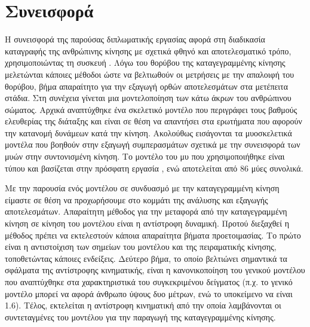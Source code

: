 \section{Συνεισφορά}

Η συνεισφορά της παρούσας διπλωματικής εργασίας αφορά στη διαδικασία καταγραφής της ανθρώπινης κίνησης με σχετικά φθηνό και αποτελεσματικό τρόπο, χρησιμοποιώντας τη συσκευή . Λόγω του θορύβου της καταγεγραμμένης κίνησης μελετώνται κάποιες μέθοδοι ώστε να βελτιωθούν οι μετρήσεις με την απαλοιφή του θορύβου, βήμα απαραίτητο για την εξαγωγή ορθών αποτελεσμάτων στα μετέπειτα στάδια. Στη συνέχεια γίνεται μια μοντελοποίηση των κάτω άκρων του ανθρώπινου σώματος. Αρχικά αναπτύχθηκε ένα σκελετικό μοντέλο που περιγράφει τους βαθμούς ελευθερίας της διάταξης και είναι σε θέση να απαντήσει στα ερωτήματα που αφορούν την κατανομή δυνάμεων κατά την κίνηση. Ακολούθως εισάγονται τα μυοσκελετικά μοντέλα που βοηθούν στην εξαγωγή συμπερασμάτων σχετικά με την συνεισφορά των μυών στην συντονισμένη κίνηση. Το μοντέλο του μυ που χρησιμοποιήθηκε είναι τύπου  και βασίζεται στην πρόσφατη εργασία \cite{millard13}, ενώ αποτελείται από 86 μύες συνολικά.

Με την παρουσία ενός μοντέλου σε συνδυασμό με την καταγεγραμμένη κίνηση είμαστε σε θέση να προχωρήσουμε στο κομμάτι της ανάλυσης και εξαγωγής αποτελεσμάτων. Απαραίτητη μέθοδος για την μεταφορά από την καταγεγραμμένη κίνηση σε κίνηση του μοντέλου είναι η αντίστροφη δυναμική. Προτού διεξαχθεί η μέθοδος πρέπει να εκτελεστούν κάποια απαραίτητα βήματα προετοιμασίας. Το πρώτο είναι η αντιστοίχιση των σημείων του μοντέλου και της πειραματικής κίνησης, τοποθετώντας κάποιες ενδείξεις. Δεύτερο βήμα, το οποίο βελτιώνει σημαντικά τα σφάλματα της αντίστροφης κινηματικής, είναι η κανονικοποίηση του γενικού μοντέλου που αναπτύχθηκε στα χαρακτηριστικά του συγκεκριμένου δείγματος (π.χ. το γενικό μοντέλο μπορεί να αφορά άνθρωπο ύψους δυο μέτρων, ενώ το υποκείμενο να είναι 1.6). Τέλος, εκτελείται η αντίστροφη κινηματική από την οποία λαμβάνονται οι συντεταγμένες του μοντέλου για την παραγωγή της καταγεγραμμένης κίνησης.

